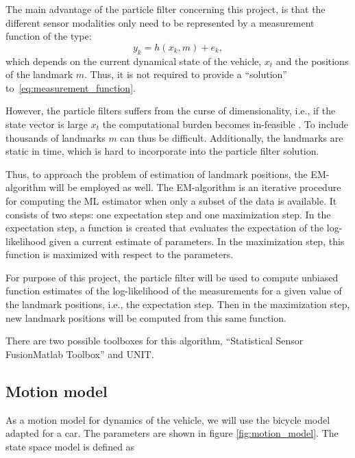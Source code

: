 The main advantage of the particle filter concerning this project, is that the
different sensor modalities only need to be represented by a measurement function
of the type:
\begin{equation}
  \label{eq:measurement_function}
  y_k = h(x_k, m) + e_k,
\end{equation}
which depends on the current dynamical state of the vehicle, $x_t$ and
the positions of the landmark $m$. Thus, it is not required to provide
a ``solution'' to~\eqref{eq:measurement_function}.

However, the particle filters suffers from the curse of
dimensionality, i.e., if the state vector is large $x_t$ the
computational burden becomes in-feasible \cite{1453762}. To include
thousands of landmarks $m$ can thus be difficult. Additionally, the
landmarks are static in time, which is hard to incorporate into the
particle filter solution.

Thus, to approach the problem of estimation of landmark positions, the
\gls{EM}-algorithm \cite{Dempster77maximumlikelihood} will be employed
as well. The \gls{EM}-algorithm is an iterative procedure for computing
the \gls{ML} estimator when only a subset of the data is available. It
consists of two steps: one expectation step and one maximization
step. In the expectation step, a function is created that evaluates
the expectation of the log-likelihood given a current estimate of
parameters. In the maximization step, this function is maximized with
respect to the parameters.

For purpose of this project, the particle filter will be used to compute
unbiased function estimates of the log-likelihood of the measurements for a
given value of the landmark positions, i.e., the expectation step.  Then in the maximization step,
new landmark positions will be computed from this same function.

There are two possible toolboxes for this algorithm, ``Statistical Sensor FusionMatlab Toolbox''\cite{gustafsson2010statistical} and \gls{UNIT}\cite{NINNESS2013631}.

\subsection{Motion model}

As a motion model for dynamics of the vehicle, we will use the bicycle model
adapted for a
car.
The parameters are shown in figure \ref{fig:motion_model}. The state space
model is defined as

